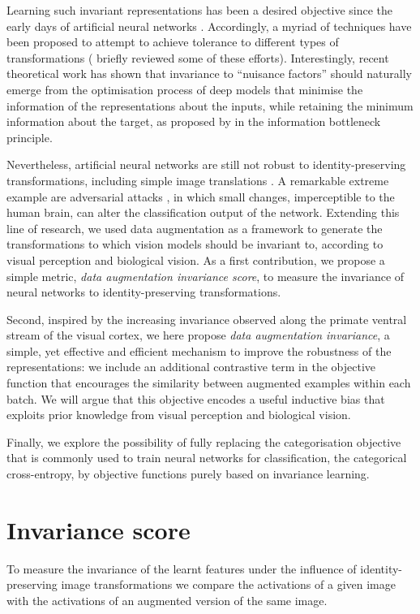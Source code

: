 {Learning such invariant representations has been a desired objective since the early days of artificial neural networks \citep{simard1992daug}. Accordingly, a myriad of techniques have been proposed to attempt to achieve tolerance to different types of transformations (\citet{cohen2016groupequivcnns} briefly reviewed some of these efforts). Interestingly, recent theoretical work \citep{achille2018emergence} has shown that invariance to ``nuisance factors'' should naturally emerge from the optimisation process of deep models that minimise the information of the representations about the inputs, while retaining the minimum information about the target, as proposed by \citet{tishby2015infobottleneck} in the information bottleneck principle.

Nevertheless, artificial neural networks are still not robust to identity-preserving transformations, including simple image translations \citep{zhang2019convolutions}. A remarkable extreme example are adversarial attacks \citep{szegedy2013adversarial}, in which small changes, imperceptible to the human brain, can alter the classification output of the network. Extending this line of research, we used data augmentation as a framework to generate the transformations to which vision models should be invariant to, according to visual perception and biological vision. As a first contribution, we propose a simple metric, \textit{data augmentation invariance score}, to measure the invariance of neural networks to identity-preserving transformations.

Second, inspired by the increasing invariance observed along the primate ventral stream of the visual cortex, we here propose \textit{data augmentation invariance}, a simple, yet effective and efficient mechanism to improve the robustness of the representations: we include an additional contrastive term in the objective function that encourages the similarity between augmented examples within each batch. We will argue that this objective encodes a useful inductive bias that exploits prior knowledge from visual perception and biological vision.

Finally, we explore the possibility of fully replacing the categorisation objective that is commonly used to train neural networks for classification, the categorical cross-entropy, by objective functions purely based on invariance learning.

\section{Invariance score}
\label{sec:invariance-eval}
To measure the invariance of the learnt features under the influence of identity-preserving image transformations we compare the activations of a given image with the activations of an augmented version of the same image. 

}
